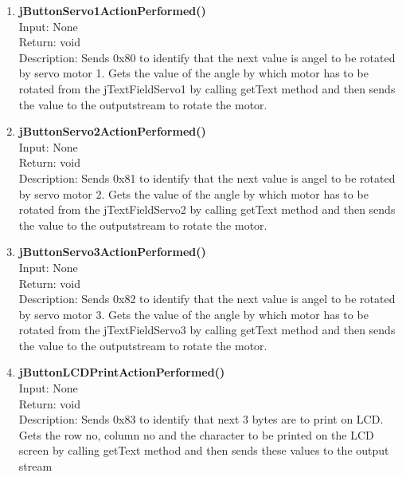 \documentclass{article}
\begin{document}
\begin{enumerate}
		\item \textbf{jButtonServo1ActionPerformed()} \vspace{0.25cm} \\
		Input: None\\
		Return: void\\
		Description: Sends 0x80 to identify that the next value is angel to be rotated by servo motor 1. Gets the value of the angle by which motor has to be rotated from the jTextFieldServo1 by calling getText method and then sends the value to the outputstream to rotate the motor. \\
		\item \textbf{jButtonServo2ActionPerformed()} \vspace{0.25cm} \\
		Input: None\\
		Return: void\\
		Description: Sends 0x81 to identify that the next value is angel to be rotated by servo motor 2. Gets the value of the angle by which motor has to be rotated from the jTextFieldServo2 by calling getText method and then sends the value to the outputstream to rotate the motor. \vspace{0.5cm} \\
		\item \textbf{jButtonServo3ActionPerformed()} \vspace{0.25cm} \\
		Input: None\\
		Return: void\\
		Description: Sends 0x82 to identify that the next value is angel to be rotated by servo motor 3. Gets the value of the angle by which motor has to be rotated from the jTextFieldServo3 by calling getText method and then sends the value to the outputstream to rotate the motor. \vspace{0.5cm} \\
		\item \textbf{jButtonLCDPrintActionPerformed()} \vspace{0.25cm} \\
		Input: None\\
		Return: void\\
		Description: Sends 0x83 to identify that next 3 bytes are to print on LCD. Gets the row no, column no and the character to be printed on the LCD screen by calling getText method and then sends these values to the output stream \vspace{0.5cm} \\

\end{enumerate}
\end{document}
